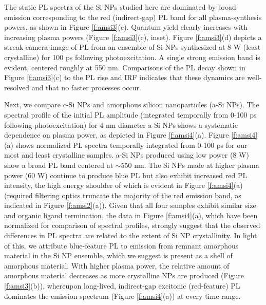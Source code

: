 The static PL spectra of the Si NPs studied here are dominated by broad emission corresponding to the red (indirect-gap) PL band for all plasma-synthesis powers, as shown in Figure \ref{f:amsi3}(c). Quantum yield clearly increases with increasing plasma powers (Figure \ref{f:amsi3}(c), inset). Figure \ref{f:amsi3}(d) depicts a streak camera image of PL from an ensemble of Si NPs synthesized at 8 W (least crystalline) for 100 ps following photoexcitation. A single strong emission band is evident, centered roughly at 550 nm. Comparisons of the PL decay shown in Figure \ref{f:amsi3}(c) to the PL rise and IRF indicates that these dynamics are well-resolved and that no faster processes occur. \par

Next, we compare c-Si NPs and amorphous silicon nanoparticles (a-Si NPs). The spectral profile of the initial PL amplitude (integrated temporally from 0-100 ps following photoexcitation) for 4 nm diameter a-Si NPs shows a systematic dependence on plasma power, as depicted in Figure \ref{f:amsi4}(a). Figure \ref{f:amsi4}(a) shows normalized PL spectra temporally integrated from 0-100 ps for our most and least crystalline samples. a-Si NPs produced using low power (8 W) show a broad PL band centered at $\sim$550 nm. The Si NPs made at higher plasma power (60 W) continue to produce blue PL but also exhibit increased red PL intensity, the high energy shoulder of which is evident in Figure \ref{f:amsi4}(a) (required filtering optics truncate the majority of the red emission band, as indicated in Figure \ref{f:amsi2}(a)). Given that all four samples exhibit similar size and organic ligand termination, the data in Figure \ref{f:amsi4}(a), which have been normalized for comparison of spectral profiles, strongly suggest that the observed differences in PL spectra are related to the extent of Si NP crystallinity. In light of this, we attribute blue-feature PL to emission from remnant amorphous material in the Si NP ensemble, which we suggest is present as a shell of amorphous material. With higher plasma power, the relative amount of amorphous material decreases as more crystalline NPs are produced (Figure \ref{f:amsi3}(b)), whereupon long-lived, indirect-gap excitonic (red-feature) PL dominates the emission spectrum (Figure \ref{f:amsi4}(a)) at every time range. \par

